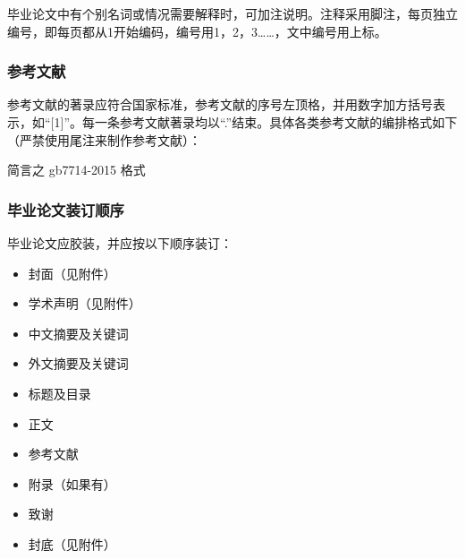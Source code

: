 毕业论文中有个别名词或情况需要解释时，可加注说明。注释采用脚注，每页独立编号，即每页都从1开始编码，编号用1，2，3……，文中编号用上标。

\subsubsection{参考文献}

参考文献的著录应符合国家标准，参考文献的序号左顶格，并用数字加方括号表示，如“[1]”。每一条参考文献著录均以“.”结束。具体各类参考文献的编排格式如下（严禁使用尾注来制作参考文献）：

简言之 gb7714-2015 格式

\subsubsection{毕业论文装订顺序}
毕业论文应胶装，并应按以下顺序装订：
\begin{itemize}
    \item	封面（见附件）
\item	学术声明（见附件）
\item	中文摘要及关键词
\item	外文摘要及关键词
\item	标题及目录
\item	正文
\item	参考文献
\item	附录（如果有）
\item	致谢
\item	封底（见附件）
\end{itemize}

